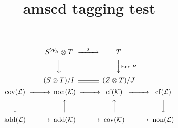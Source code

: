 \documentclass{article}
\title{amscd tagging test}
\DeclareMathOperator{\End}{End}
\DeclareMathOperator{\cov}{cov}
\DeclareMathOperator{\cf}{cf}
\DeclareMathOperator{\add}{add}
\DeclareMathOperator{\non}{non}
\begin{document}
\begin{equation}
\begin{CD} 
S^{{\mathcal{W}}_\Lambda}\otimes T @>j>> T\\
@VVV @VV{\End P}V\\
(S\otimes T)/I @= (Z\otimes T)/J
\end{CD}
\end{equation}
\begin{equation}
\begin{CD}
\cov(\mathcal{L}) @>>> \non(\mathcal{K}) @>>> \cf(\mathcal{K}) @>>> 
\cf(\mathcal{L})\\
@VVV @AAA @AAA @VVV\\
\add(\mathcal{L}) @>>> \add(\mathcal{K}) @>>> \cov(\mathcal{K}) @>>> 
\non(\mathcal{L})
\end{CD}
\end{equation}
\end{document}
